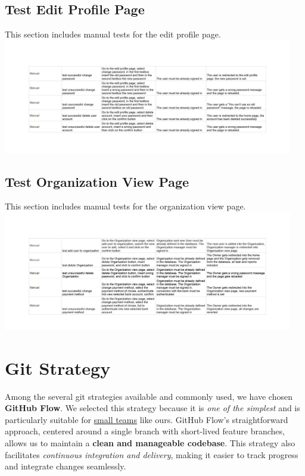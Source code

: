 \documentclass{article}
\begin{document}
\subsection*{Test Edit Profile Page}
This section includes manual tests for the edit profile page.
\newline
\includegraphics[width=0.95\textwidth]{images/Test_EditProfile.jpg}

\subsection*{Test Organization View Page}
This section includes manual tests for the organization view page.
\newline
\includegraphics[width=0.95\textwidth]{images/Test_OrganizationView.jpg}

\section{Git Strategy}

Among the several git strategies available and commonly used, we have chosen \textbf{GitHub Flow}. We selected this strategy because it is \textit{one of the simplest} and is particularly suitable for \underline{small teams} like ours. GitHub Flow's straightforward approach, centered around a single branch with short-lived feature branches, allows us to maintain a \textbf{clean and manageable codebase}. This strategy also facilitates \textit{continuous integration and delivery}, making it easier to track progress and integrate changes seamlessly.
\end{document}
